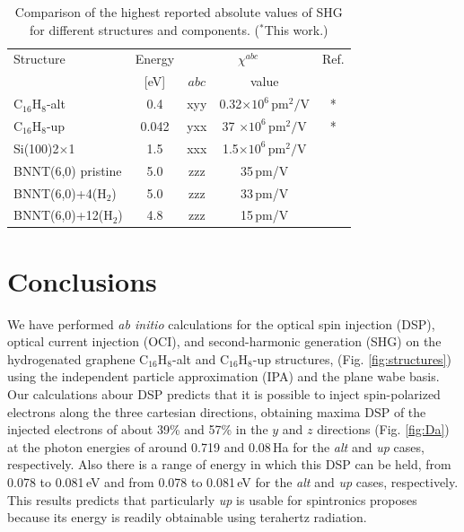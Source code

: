 \documentclass[pss]{wiley2sp} %
\begin{document}
\begin{table}[htb]%
  \sidecaption
  \begin{tabular}{lcccc}
  \hline
    Structure & Energy & \multicolumn{2}{c}{$\chi^{abc} $} &  Ref.\\
    \cline{3-4}
              & [eV]   & $abc$ & value \\
    \hline
    C$_{16}$H$_{8}$-alt   & 0.4   & xyy   & 0.32$\times 10^{6}\,\mathrm{pm}^{2}/\mathrm{V}$  & *     \\
    C$_{16}$H$_{8}$-up    & 0.042 & yxx   & 37 $\times  10^{6}\,\mathrm{pm}^{2}/\mathrm{V}$  & *     \\
    Si(100)2$\times$1     & 1.5   & xxx   & 1.5$\times  10^{6}\,\mathrm{pm}^{2}/\mathrm{V}$  & \cite{andersonPRB15}  \\
    BNNT(6,0) pristine    & 5.0   & zzz   & 35\,pm/V  & \cite{salazarPRB14} \\
    BNNT(6,0)+4(H$_{2}$)  & 5.0   & zzz   & 33\,pm/V  & \cite{salazarPRB14} \\
    BNNT(6,0)+12(H$_{2}$) & 4.8   & zzz   & 15\,pm/V  & \cite{salazarPRB14} \\
  \hline
  \end{tabular}
  \caption[]{%
  Comparison of the highest reported absolute values of SHG for 
    different structures and components. ($^{*}$This work.)}
  \label{tab:shgcomp}
\end{table}

\section{Conclusions}\label{sec:conclusions}

We have performed \emph{ab initio} calculations for the optical spin injection (DSP), optical current injection (OCI), and second-harmonic generation (SHG) on the hydrogenated graphene C$_{16}$H$_{8}$-alt and C$_{16}$H$_{8}$-up structures, (Fig. \ref{fig:structures}) using the independent particle approximation (IPA) and the plane wabe basis. Our calculations abour DSP predicts that it is possible to inject spin-polarized electrons along the three cartesian directions, obtaining maxima DSP of the injected electrons of about 39\% and 57\% in the $y$ and $z$ directions  (Fig. \ref{fig:Da}) at the photon energies of around 0.719 and 0.08\,Ha  for the \emph{alt} and \emph{up} cases, respectively. Also there is a range of energy in which this DSP can be held, from 0.078 to 0.081\,eV and from 0.078 to 0.081\,eV for the \emph{alt} and \emph{up} cases, respectively. This results predicts that particularly \emph{up} is usable for spintronics proposes because its energy is readily obtainable using terahertz radiation.
\end{document}

